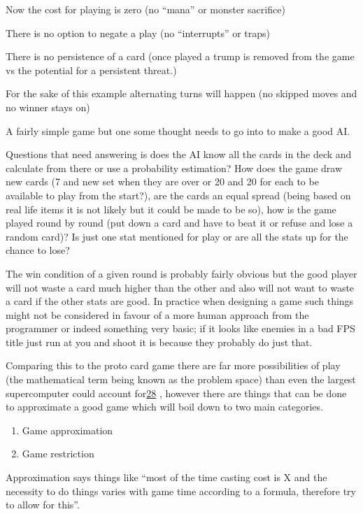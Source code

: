 \documentclass[
]{book}
\providecommand{\tightlist}{%
  \setlength{\itemsep}{0pt}\setlength{\parskip}{0pt}}
\begin{document}
Now the cost for playing is zero (no ``mana'' or monster sacrifice)

There is no option to negate a play (no ``interrupts'' or traps)

There is no persistence of a card (once played a trump is removed from the game vs the potential for a persistent threat.)

For the sake of this example alternating turns will happen (no skipped moves and no winner stays on)

A fairly simple game but one some thought needs to go into to make a good AI.

Questions that need answering is does the AI know all the cards in the deck and calculate from there or use a probability estimation? How does the game draw new cards (7 and new set when they are over or 20 and 20 for each to be available to play from the start?), are the cards an equal spread (being based on real life items it is not likely but it could be made to be so), how is the game played round by round (put down a card and have to beat it or refuse and lose a random card)? Is just one stat mentioned for play or are all the stats up for the chance to lose?

The win condition of a given round is probably fairly obvious but the good player will not waste a card much higher than the other and also will not want to waste a card if the other stats are good. In practice when designing a game such things might not be considered in favour of a more human approach from the programmer or indeed something very basic; if it looks like enemies in a bad FPS title just run at you and shoot it is because they probably do just that.

Comparing this to the proto card game there are far more possibilities of play (the mathematical term being known as the problem space) than even the largest supercomputer could account for\href{romhacking202029.html\#fn28x0}{28} , however there are things that can be done to approximate a good game which will boil down to two main categories.

\begin{enumerate}
\def\labelenumi{\arabic{enumi}.}
\tightlist
\item
  Game approximation
\item
  Game restriction
\end{enumerate}

Approximation says things like ``most of the time casting cost is X and the necessity to do things varies with game time according to a formula, therefore try to allow for this''.
\end{document}
